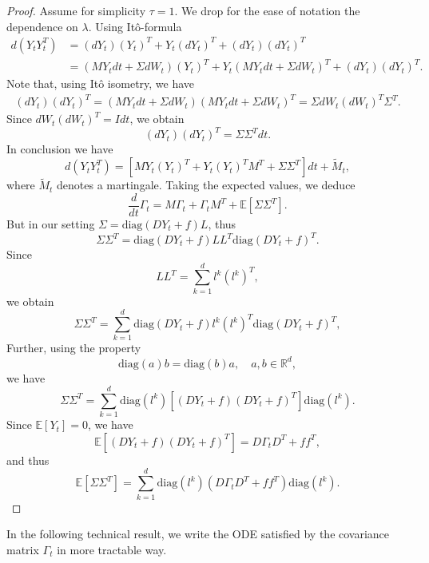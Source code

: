\documentclass[10pt]{amsart}
\numberwithin{equation}{section}
\begin{document}
\begin{proof}
    Assume for simplicity $\tau = 1$. We drop for the ease of notation the dependence on $\lambda$. Using It\^{o}-formula
    \begin{equation*}
        \begin{split}
            d (Y_t Y_t^T) &= (dY_t)(Y_t)^T + Y_t(dY_t)^T + (dY_t)(dY_t)^T  \\
            & = (MY_t dt + \Sigma  dW_t) (Y_t)^T + Y_t( MY_tdt+ \Sigma  dW_t)^T + (dY_t)(dY_t)^T.
        \end{split}
    \end{equation*}
    Note that, using It\^{o} isometry, we have
    \begin{equation*}
        \begin{split}
            (dY_t)(dY_t)^T =(MY_tdt+ \Sigma  dW_t) (MY_tdt+ \Sigma  dW_t)^T = \Sigma  dW_t (dW_t)^T \Sigma^T.
        \end{split}
    \end{equation*}
    Since $dW_t (dW_t)^T = I dt$, we obtain
    $$
    (dY_t)(dY_t)^T = \Sigma \Sigma^T dt.
    $$
    In conclusion we have
    $$
    d(Y_t Y_t^T) = [M Y_t(Y_t)^T  + Y_t (Y_t)^T M^T + \Sigma \Sigma^T]dt + \widetilde M_t,
    $$
    where $\widetilde M_t$ denotes a martingale. Taking the expected values, we deduce
    $$
    \frac{d}{dt} \Gamma_t = M  \Gamma_t + \Gamma_t  M^T + \mathbb{E}[\Sigma \Sigma^T].
    $$
    But in our setting $\Sigma = \mathrm{diag} (DY_t +f)L$, thus
    $$
    \Sigma \Sigma^T = \mathrm{diag} (DY_t +f) L L^T \mathrm{diag}( DY_t +f)^T.
    $$
    Since
    $$
    L L^T = \sum_{k =1 }^d l^k (l^k)^T,
    $$
    we obtain
    $$
    \Sigma \Sigma^T = \sum_{k = 1}^d \mathrm{diag} ( DY_t + f) l^k (l^k)^T \mathrm{diag} (DY_t +f)^T,
    $$
    Further, using the property
    $$
    \mathrm{diag} (a) b = \mathrm{diag}(b)a, \quad a,b \in \mathbb{R}^d,
    $$
    we have
    $$
    \Sigma \Sigma^T = \sum_{k =1 }^d \mathrm{diag} (l^k ) \left[(DY_t +f) (DY_t +f)^T \right] \mathrm{diag}(l^k).
    $$
    Since $\mathbb{E}[Y_t] = 0$, we have
    $$
    \mathbb{E}\left[(DY_t +f) (DY_t+f)^T \right] = D \Gamma_t  D^T + f f^T,
    $$
    and thus
    $$
    \mathbb{E}\left[\Sigma \Sigma^T \right] = \sum_{k = 1}^d \mathrm{diag}(l^k) (D \Gamma_t  D^T + f f^T) \mathrm{diag} (l^k).
    $$
\end{proof}
In the following technical result, we write the ODE satisfied by the covariance matrix $\Gamma_t $ in more tractable way.
\end{document}
